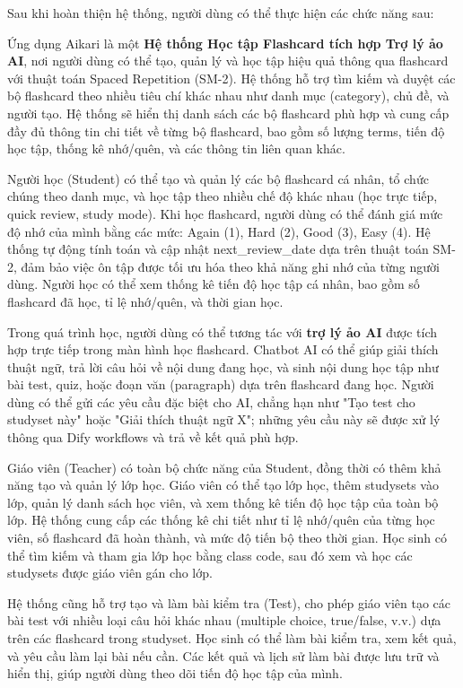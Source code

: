 \documentclass[../DoAn.tex]{subfiles}
\begin{document}
Sau khi hoàn thiện hệ thống, người dùng có thể thực hiện các chức năng sau:

Ứng dụng Aikari là một \textbf{Hệ thống Học tập Flashcard tích hợp Trợ lý ảo AI}, nơi người dùng có thể tạo, quản lý và học tập hiệu quả thông qua flashcard với thuật toán Spaced Repetition (SM-2). Hệ thống hỗ trợ tìm kiếm và duyệt các bộ flashcard theo nhiều tiêu chí khác nhau như danh mục (category), chủ đề, và người tạo. Hệ thống sẽ hiển thị danh sách các bộ flashcard phù hợp và cung cấp đầy đủ thông tin chi tiết về từng bộ flashcard, bao gồm số lượng terms, tiến độ học tập, thống kê nhớ/quên, và các thông tin liên quan khác.

Người học (Student) có thể tạo và quản lý các bộ flashcard cá nhân, tổ chức chúng theo danh mục, và học tập theo nhiều chế độ khác nhau (học trực tiếp, quick review, study mode). Khi học flashcard, người dùng có thể đánh giá mức độ nhớ của mình bằng các mức: Again (1), Hard (2), Good (3), Easy (4). Hệ thống tự động tính toán và cập nhật next\_review\_date dựa trên thuật toán SM-2, đảm bảo việc ôn tập được tối ưu hóa theo khả năng ghi nhớ của từng người dùng. Người học có thể xem thống kê tiến độ học tập cá nhân, bao gồm số flashcard đã học, tỉ lệ nhớ/quên, và thời gian học.

Trong quá trình học, người dùng có thể tương tác với \textbf{trợ lý ảo AI} được tích hợp trực tiếp trong màn hình học flashcard. Chatbot AI có thể giúp giải thích thuật ngữ, trả lời câu hỏi về nội dung đang học, và sinh nội dung học tập như bài test, quiz, hoặc đoạn văn (paragraph) dựa trên flashcard đang học. Người dùng có thể gửi các yêu cầu đặc biệt cho AI, chẳng hạn như "Tạo test cho studyset này" hoặc "Giải thích thuật ngữ X"; những yêu cầu này sẽ được xử lý thông qua Dify workflows và trả về kết quả phù hợp.

Giáo viên (Teacher) có toàn bộ chức năng của Student, đồng thời có thêm khả năng tạo và quản lý lớp học. Giáo viên có thể tạo lớp học, thêm studysets vào lớp, quản lý danh sách học viên, và xem thống kê tiến độ học tập của toàn bộ lớp. Hệ thống cung cấp các thống kê chi tiết như tỉ lệ nhớ/quên của từng học viên, số flashcard đã hoàn thành, và mức độ tiến bộ theo thời gian. Học sinh có thể tìm kiếm và tham gia lớp học bằng class code, sau đó xem và học các studysets được giáo viên gán cho lớp.

Hệ thống cũng hỗ trợ tạo và làm bài kiểm tra (Test), cho phép giáo viên tạo các bài test với nhiều loại câu hỏi khác nhau (multiple choice, true/false, v.v.) dựa trên các flashcard trong studyset. Học sinh có thể làm bài kiểm tra, xem kết quả, và yêu cầu làm lại bài nếu cần. Các kết quả và lịch sử làm bài được lưu trữ và hiển thị, giúp người dùng theo dõi tiến độ học tập của mình.
\end{document}
